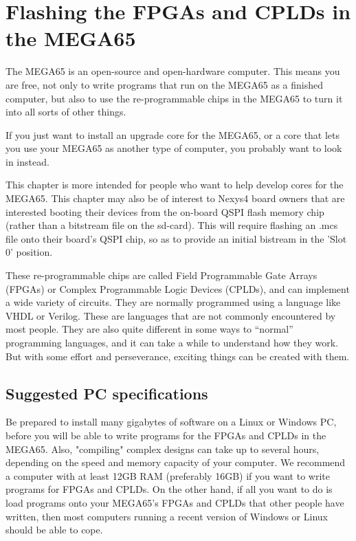 \chapter{Flashing the FPGAs and CPLDs in the MEGA65}
\label{cha:fpgacpldflashing}

The MEGA65 is an open-source and open-hardware computer. This means you are free,
not only to write programs that run on the MEGA65 as a finished computer, but also to
use the re-programmable chips in the MEGA65 to turn it into all sorts of other things.

If you just want to install an upgrade core for the MEGA65, or a core that lets you use
your MEGA65 as another type of computer, you probably want to look in
 instead.

This chapter is more intended for people who want to help develop cores for the MEGA65. This chapter may also be of interest to Nexys4 board owners that are interested booting their devices from the on-board QSPI flash memory chip (rather than a bitstream file on the sd-card). This will require flashing an .mcs file onto their board's QSPI chip, so as to provide an initial bistream in the 'Slot 0' position.

These re-programmable chips are called Field Programmable Gate Arrays (FPGAs) or
Complex Programmable Logic Devices (CPLDs), and can implement a wide variety of circuits.
They are normally programmed using a language like VHDL or Verilog.  These
are languages that are not commonly encountered by most people.  They are also quite
different in some ways to ``normal'' programming languages, and it can take a while to
understand how they work. But with some effort and perseverance, exciting things can be created with them.

\section{Suggested PC specifications}

Be prepared to install many gigabytes of software on a Linux or Windows PC, before you will
be able to write programs for the FPGAs and CPLDs in the MEGA65.  Also,
"compiling" complex
designs can take up to several hours, depending on the speed and memory
capacity of your computer.
We recommend a computer with at least 12GB RAM (preferably 16GB) if you want to write
programs for FPGAs and CPLDs. On the other hand, if all you want to do is load programs onto
your MEGA65's FPGAs and CPLDs that other people have written, then most
computers running a recent
version of Windows or Linux should be able to cope.

